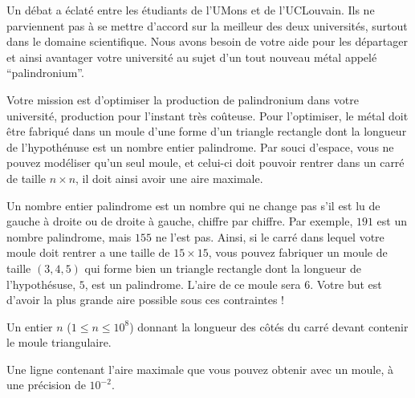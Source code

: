 \problemname{\problemyamlname}

Un débat a éclaté entre les étudiants de l'UMons et de l'UCLouvain.
Ils ne parviennent pas à se mettre d'accord sur la meilleur des deux universités, surtout dans le domaine scientifique.
Nous avons besoin de votre aide pour les départager et ainsi avantager votre université au sujet d'un tout nouveau métal appelé ``palindronium''.

Votre mission est d'optimiser la production de palindronium dans votre université, production pour l'instant très coûteuse.
Pour l'optimiser, le métal doit être fabriqué dans un moule d'une forme d'un triangle rectangle dont la longueur de l'hypothénuse est un nombre entier palindrome.
Par souci d'espace, vous ne pouvez modéliser qu'un seul moule, et celui-ci doit pouvoir rentrer dans un carré de taille $n \times n$, il doit ainsi avoir une aire maximale.

Un nombre entier palindrome est un nombre qui ne change pas s'il est lu de gauche à droite ou de droite à gauche, chiffre par chiffre.
Par exemple, $191$ est un nombre palindrome, mais $155$ ne l'est pas.
Ainsi, si le carré dans lequel votre moule doit rentrer a une taille de $15 \times 15$, vous pouvez fabriquer un moule de taille $(3,4,5)$ qui forme bien un triangle rectangle dont la longueur de l'hypothésuse, $5$, est un palindrome.
L'aire de ce moule sera $6$.
Votre but est d'avoir la plus grande aire possible sous ces contraintes !

\begin{Input}
	Un entier $n$ ($1 \le n \le 10^8$) donnant la longueur des côtés du carré devant contenir le moule triangulaire.
\end{Input}

\begin{Output}
	Une ligne contenant l'aire maximale que vous pouvez obtenir avec un moule, à une précision de $10^{-2}$.
\end{Output}
